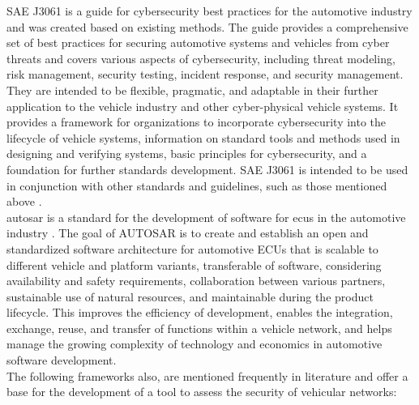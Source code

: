SAE J3061 is a guide for cybersecurity best practices for the automotive industry and was created based on existing methods. 
The guide provides a comprehensive set of best practices for securing automotive systems and vehicles from cyber threats and covers various aspects of cybersecurity, including threat modeling, risk management, security testing, incident response, and security management.
They are intended to be flexible, pragmatic, and adaptable in their further application to the vehicle industry and other cyber-physical vehicle systems. 
It provides a framework for organizations to incorporate cybersecurity into the lifecycle of vehicle systems, information on standard tools and methods used in designing and verifying systems, basic principles for cybersecurity, and a foundation for further standards development. 
SAE J3061 is intended to be used in conjunction with other standards and guidelines, such as those mentioned above \cite{sae_j3061}.\\

\gls{autosar} is a standard for the development of software for \gls{ecu}s in the automotive industry \cite{autosar}.
The goal of AUTOSAR is to create and establish an open and standardized software architecture for automotive ECUs that is scalable to different vehicle and platform variants, 
transferable of software, considering availability and safety requirements, collaboration between various partners, sustainable use of natural resources, 
and maintainable during the product lifecycle. 
This improves the efficiency of development, enables the integration, exchange, reuse, and transfer of functions within a vehicle network, 
and helps manage the growing complexity of technology and economics in automotive software development.\\

The following frameworks also, are mentioned frequently in literature and offer a base for the development of a tool to assess the security of vehicular networks:\\

